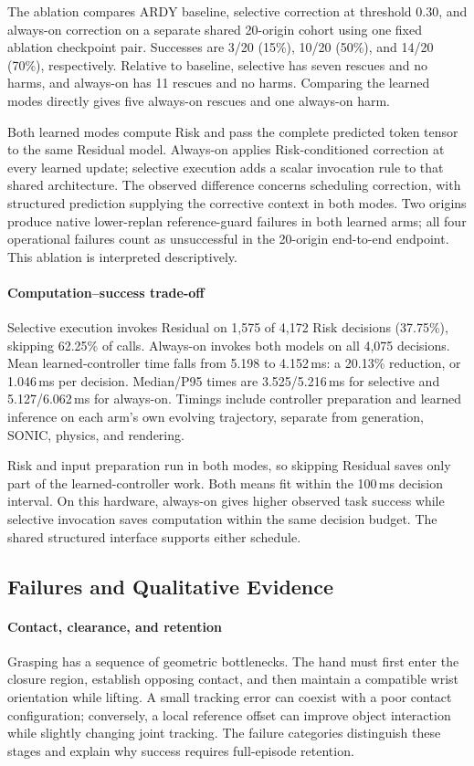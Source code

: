 \documentclass[letterpaper,10pt,conference]{ieeeconf}
\begin{document}
The ablation compares ARDY baseline, selective correction at threshold 0.30, and always-on correction on a separate shared 20-origin cohort using one fixed ablation checkpoint pair. Successes are 3/20 (15\%), 10/20 (50\%), and 14/20 (70\%), respectively. Relative to baseline, selective has seven rescues and no harms, and always-on has 11 rescues and no harms. Comparing the learned modes directly gives five always-on rescues and one always-on harm.

Both learned modes compute Risk and pass the complete predicted token tensor to the same Residual model. Always-on applies Risk-conditioned correction at every learned update; selective execution adds a scalar invocation rule to that shared architecture. The observed difference concerns scheduling correction, with structured prediction supplying the corrective context in both modes. Two origins produce native lower-replan reference-guard failures in both learned arms; all four operational failures count as unsuccessful in the 20-origin end-to-end endpoint. This ablation is interpreted descriptively.

\paragraph{Computation--success trade-off}
Selective execution invokes Residual on 1,575 of 4,172 Risk decisions (37.75\%), skipping 62.25\% of calls. Always-on invokes both models on all 4,075 decisions. Mean learned-controller time falls from 5.198 to 4.152\,ms: a 20.13\% reduction, or 1.046\,ms per decision. Median/P95 times are 3.525/5.216\,ms for selective and 5.127/6.062\,ms for always-on. Timings include controller preparation and learned inference on each arm's own evolving trajectory, separate from generation, SONIC, physics, and rendering.

Risk and input preparation run in both modes, so skipping Residual saves only part of the learned-controller work. Both means fit within the 100\,ms decision interval. On this hardware, always-on gives higher observed task success while selective invocation saves computation within the same decision budget. The shared structured interface supports either schedule.

\subsection{Failures and Qualitative Evidence}


\paragraph{Contact, clearance, and retention}
Grasping has a sequence of geometric bottlenecks. The hand must first enter the closure region, establish opposing contact, and then maintain a compatible wrist orientation while lifting. A small tracking error can coexist with a poor contact configuration; conversely, a local reference offset can improve object interaction while slightly changing joint tracking. The failure categories distinguish these stages and explain why success requires full-episode retention.
\end{document}
